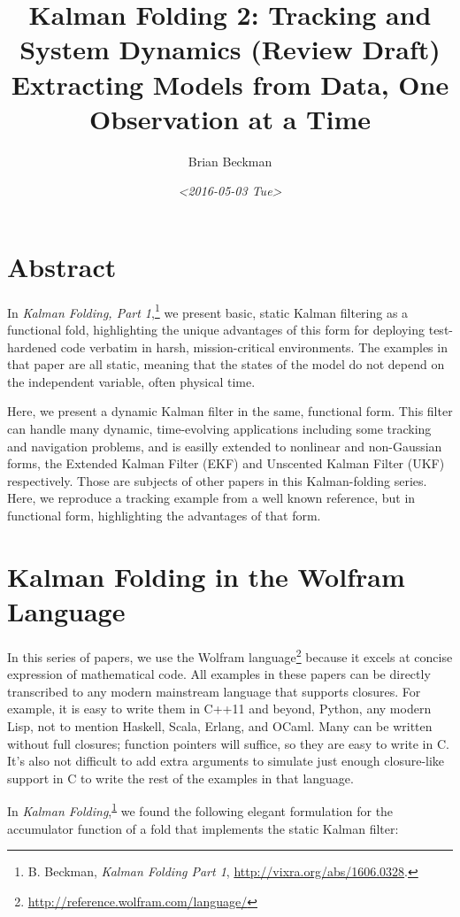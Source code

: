 \documentclass[10pt,oneside,x11names]{article}
\author{Brian Beckman}
\date{\textit{<2016-05-03 Tue>}}
\title{Kalman Folding 2: Tracking and System Dynamics (Review Draft)\\\medskip
\large Extracting Models from Data, One Observation at a Time}
\begin{document}
\maketitle
\setcounter{tocdepth}{2}
\tableofcontents


\section{Abstract}
\label{sec:org291167d}

In \emph{Kalman Folding, Part 1},\footnote{B. Beckman, \emph{Kalman Folding Part 1}, \url{http://vixra.org/abs/1606.0328}.\label{org11d156c}} we present basic, static Kalman filtering
as a functional fold, highlighting the unique advantages of this form for
deploying test-hardened code verbatim in harsh, mission-critical environments.
The examples in that paper are all static, meaning that the states of the model
do not depend on the independent variable, often physical time.

Here, we present a dynamic Kalman filter in the same, functional form. This
filter can handle many dynamic, time-evolving applications including some
tracking and navigation problems, and is easilly extended to nonlinear and
non-Gaussian forms, the Extended Kalman Filter (EKF) and Unscented Kalman Filter
(UKF) respectively. Those are subjects of other papers in this Kalman-folding
series. Here, we reproduce a tracking example from a well known reference, but
in functional form, highlighting the advantages of that form.

\section{Kalman Folding in the Wolfram Language}
\label{sec:org03097f9}

In this series of papers, we use the Wolfram language\footnote{\url{http://reference.wolfram.com/language/}} because it excels
at concise expression of mathematical code. All examples in these papers can be
directly transcribed to any modern mainstream language that supports closures.
For example, it is easy to write them in C++11 and beyond, Python, any modern
Lisp, not to mention Haskell, Scala, Erlang, and OCaml. Many can be written
without full closures; function pointers will suffice, so they are easy to write
in C. It's also not difficult to add extra arguments to simulate just enough
closure-like support in C to write the rest of the examples in that language.

In \emph{Kalman Folding},\textsuperscript{\ref{org11d156c}} we found the following elegant formulation for the
accumulator function of a fold that implements the static Kalman filter:
\end{document}
